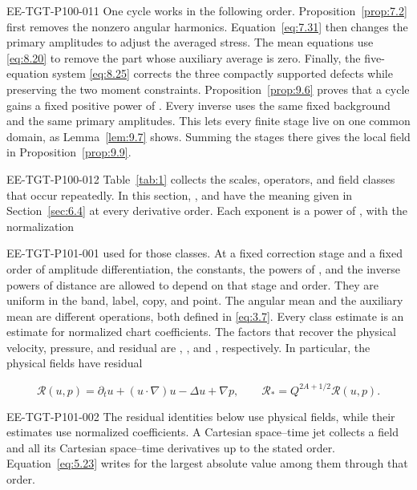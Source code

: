 \begin{EESegment}{EE-TGT-P100-011}
One cycle works in the following order. Proposition~\ref{prop:7.2} first removes the nonzero angular
harmonics. Equation~\eqref{eq:7.31} then changes the primary amplitudes to adjust the averaged
stress. The mean equations use \eqref{eq:8.20} to remove the part whose auxiliary average is zero.
Finally, the five-equation system \eqref{eq:8.25} corrects the three compactly supported defects
while preserving the two moment constraints. Proposition~\ref{prop:9.6} proves that a cycle gains a
fixed positive power of . Every inverse uses the same fixed
background and the same primary amplitudes. This lets every finite stage live on one common domain,
as Lemma~\ref{lem:9.7} shows. Summing the stages there gives the local field in
Proposition~\ref{prop:9.9}.
\end{EESegment}

\begin{EESegment}{EE-TGT-P100-012}
Table~\ref{tab:1} collects the scales, operators, and field classes that occur repeatedly. In this
section, , and
 have the meaning given in
Section~\ref{sec:6.4} at every derivative order. Each exponent is a power of
, with the normalization
\end{EESegment}
%
\begin{EESegment}{EE-TGT-P101-001}
used for those classes. At a fixed correction stage and a fixed order of amplitude differentiation,
the constants, the powers of , and the inverse powers of distance are
allowed to depend on that stage and order. They are uniform in the band, label, copy, and point. The
angular mean  and the auxiliary mean
 are different operations, both defined in
\eqref{eq:3.7}. Every class estimate is an estimate for normalized chart coefficients. The factors
that recover the physical velocity, pressure, and residual are
, , and
, respectively. In particular, the physical fields have residual
\end{EESegment}
\[
\mathscr R(u,p)=\partial_tu+(u\cdot\nabla)u-\Delta u+\nabla p,
\qquad
\mathscr R_*=Q^{2A+1/2}\mathscr R(u,p).
\]
\begin{EESegment}{EE-TGT-P101-002}
The residual identities below use physical fields, while their estimates use normalized
coefficients. A Cartesian space--time jet collects a field and all its Cartesian space--time
derivatives up to the stated order. Equation~\eqref{eq:5.23} writes
 for the largest absolute value among them through that order.
\end{EESegment}

